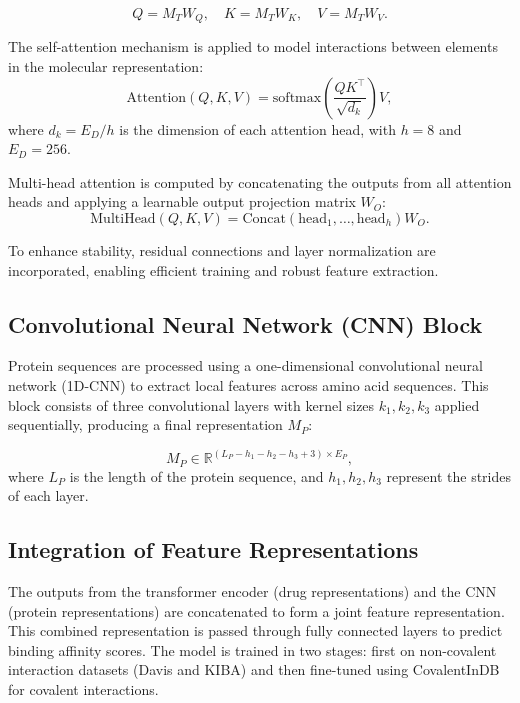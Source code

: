 \documentclass{article}
\begin{document}
\begin{equation}
	Q = M_T W_Q, \quad K = M_T W_K, \quad V = M_T W_V.
\end{equation}

The self-attention mechanism is applied to model interactions between elements in the molecular representation:
\begin{equation}
	\text{Attention}(Q, K, V) = \text{softmax}\left(\frac{Q K^\top}{\sqrt{d_k}}\right)V,
\end{equation}
where $d_k = E_D / h$ is the dimension of each attention head, with $h=8$ and $E_D=256$.

Multi-head attention is computed by concatenating the outputs from all attention heads and applying a learnable output projection matrix $W_O$:
\begin{equation}
	\text{MultiHead}(Q, K, V) = \text{Concat}(\text{head}_1, \ldots, \text{head}_h) W_O.
\end{equation}

To enhance stability, residual connections and layer normalization are incorporated, enabling efficient training and robust feature extraction.

\subsection{Convolutional Neural Network (CNN) Block}

Protein sequences are processed using a one-dimensional convolutional neural network (1D-CNN) to extract local features across amino acid sequences. This block consists of three convolutional layers with kernel sizes $k_1, k_2, k_3$ applied sequentially, producing a final representation $M_P$:

\begin{equation}
	M_P \in \mathbb{R}^{(L_P - h_1 - h_2 - h_3 + 3) \times E_P},
\end{equation}
where $L_P$ is the length of the protein sequence, and $h_1, h_2, h_3$ represent the strides of each layer.

\subsection{Integration of Feature Representations}

The outputs from the transformer encoder (drug representations) and the CNN (protein representations) are concatenated to form a joint feature representation. This combined representation is passed through fully connected layers to predict binding affinity scores. The model is trained in two stages: first on non-covalent interaction datasets (Davis and KIBA) and then fine-tuned using CovalentInDB for covalent interactions.
\end{document}
